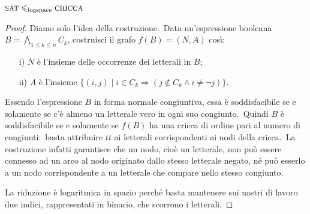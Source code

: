 \begin{property}
    $\mbox{\footnotesize SAT} \leqslant_{\mathrm{logspace}} \mbox{\footnotesize CRICCA}$
\end{property}

\begin{proof}

    Diamo solo l'idea della costruzione.\
    Data un'espressione booleana $B = \bigwedge_{1 \leq k \leq n} C_k$, costruisci il grafo $f(B) = (N,A)$ così:
    \begin{itemize}
        \item[i)] $N$ è l'insieme delle occorrenze dei letterali in $B$;
        \item[ii)] $A$ è l'insieme $\{(i,j) \mid i \in C_k \Rightarrow (j \notin C_k \land i \neq \neg j)\}$.
    \end{itemize}
    Essendo l'espressione $B$ in forma normale congiuntiva, essa è soddisfacibile se e solamente se c'è almeno un letterale vero in ogni suo congiunto.\
    Quindi $B$ è soddisfacibile se e solamente se $f(B)$ ha una cricca di ordine pari al numero di congiunti:\ basta attribuire $\mathit{tt}$ ai letterali corrispondenti ai nodi della cricca.\
    La costruzione infatti garantisce che un nodo, cioè un letterale, non può essere connesso ad un arco al nodo originato dallo stesso letterale negato, né può esserlo a un nodo corrispondente a un letterale che compare nello stesso congiunto.\

    La riduzione è logaritmica in spazio perché basta mantenere sui nastri di lavoro due indici, rappresentati in binario, che scorrono i letterali.

\end{proof}

